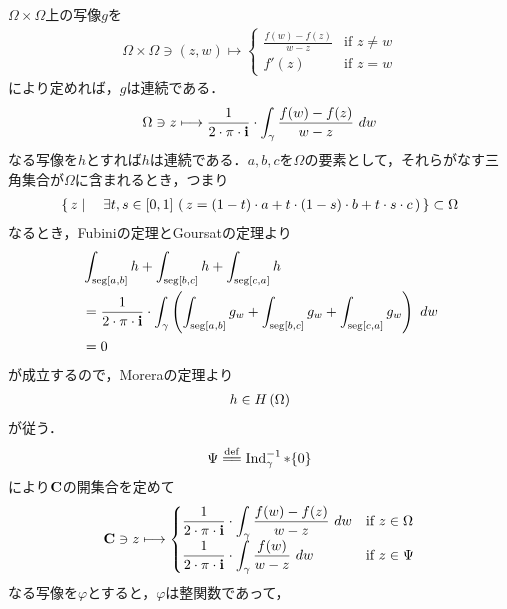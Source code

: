 	\begin{sketch}[大雑把]
		$\Omega \times \Omega$上の写像$g$を
		\begin{align}
			\Omega \times \Omega \ni (z,w) \longmapsto
			\begin{cases}
				{\displaystyle \frac{f(w) - f(z)}{w-z}} & \mbox{if } z \neq w \\
				f'(z) & \mbox{if } z = w
			\end{cases}
		\end{align}
		により定めれば，$g$は連続である．
		\begin{align}
			\Omega \ni z \longmapsto \frac{1}{2\cdot\pi\cdot\mathbf{i}} \cdot \int_{\gamma} \frac{f(w)-f(z)}{w-z}\ dw
		\end{align}
		なる写像を$h$とすれば$h$は連続である．$a,b,c$を$\Omega$の要素として，それらがなす三角集合が$\Omega$に含まれるとき，つまり
		\begin{align}
			\left\{\, z \mid \quad \exists t,s \in [0,1]\, 
			\left(\, z = (1-t) \cdot a 
			+ t \cdot (1-s) \cdot b 
			+ t \cdot s \cdot c\, \right)\, \right\} \subset \Omega
		\end{align}
		なるとき，Fubiniの定理とGoursatの定理より
		\begin{align}
			&\int_{\operatorname{seg}[a,b]} h + \int_{\operatorname{seg}[b,c]} h + \int_{\operatorname{seg}[c,a]} h \\
			&= \frac{1}{2 \cdot \pi \cdot \mathbf{i}} \cdot \int_{\gamma} 
			\left(\int_{\operatorname{seg}[a,b]} g_w + \int_{\operatorname{seg}[b,c]} g_w + \int_{\operatorname{seg}[c,a]} g_w\right)\ dw \\
			&= 0
		\end{align}
		が成立するので，Moreraの定理より
		\begin{align}
			h \in H\left(\Omega\right)
		\end{align}
		が従う．
		\begin{align}
			\Psi \defeq \Ind_{\gamma}^{-1} \ast \{0\}
		\end{align}
		により$\mathbf{C}$の開集合を定めて
		\begin{align}
			\mathbf{C} \ni z \longmapsto
			\begin{cases}
				{\displaystyle \frac{1}{2\cdot\pi\cdot\mathbf{i}} \cdot \int_{\gamma} \frac{f(w)-f(z)}{w-z}\ dw} & \mbox{if } z \in \Omega \\
				{\displaystyle \frac{1}{2\cdot\pi\cdot\mathbf{i}} \cdot \int_{\gamma} \frac{f(w)}{w-z}\ dw} & \mbox{if } z \in \Psi
			\end{cases}
		\end{align}
		なる写像を$\varphi$とすると，$\varphi$は整関数であって，
		\begin{align}

\end{align}
\end{sketch}
